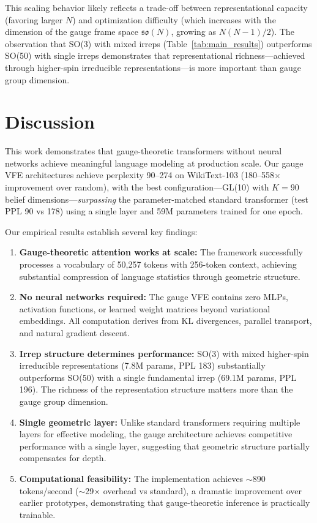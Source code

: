 \documentclass[twoside,11pt]{article}
\begin{document}
This scaling behavior likely reflects a trade-off between representational capacity (favoring larger $N$) and optimization difficulty (which increases with the dimension of the gauge frame space $\mathfrak{so}(N)$, growing as $N(N-1)/2$). The observation that SO(3) with mixed irreps (Table~\ref{tab:main_results}) outperforms SO(50) with single irreps demonstrates that representational richness---achieved through higher-spin irreducible representations---is more important than gauge group dimension.

\section{Discussion}
\label{sec:discussion}

This work demonstrates that gauge-theoretic transformers without neural networks achieve meaningful language modeling at production scale. Our gauge VFE architectures achieve perplexity 90--274 on WikiText-103 (180--558$\times$ improvement over random), with the best configuration---GL(10) with $K{=}90$ belief dimensions---\emph{surpassing} the parameter-matched standard transformer (test PPL 90 vs 178) using a single layer and 59M parameters trained for one epoch.

Our empirical results establish several key findings:

\begin{enumerate}
  \item \textbf{Gauge-theoretic attention works at scale:} The framework successfully processes a vocabulary of 50,257 tokens with 256-token context, achieving substantial compression of language statistics through geometric structure.

  \item \textbf{No neural networks required:} The gauge VFE contains zero MLPs, activation functions, or learned weight matrices beyond variational embeddings. All computation derives from KL divergences, parallel transport, and natural gradient descent.

  \item \textbf{Irrep structure determines performance:} SO(3) with mixed higher-spin irreducible representations (7.8M params, PPL 183) substantially outperforms SO(50) with a single fundamental irrep (69.1M params, PPL 196). The richness of the representation structure matters more than the gauge group dimension.

  \item \textbf{Single geometric layer:} Unlike standard transformers requiring multiple layers for effective modeling, the gauge architecture achieves competitive performance with a single layer, suggesting that geometric structure partially compensates for depth.

  \item \textbf{Computational feasibility:} The implementation achieves $\sim$890 tokens/second ($\sim$29$\times$ overhead vs standard), a dramatic improvement over earlier prototypes, demonstrating that gauge-theoretic inference is practically trainable.
\end{enumerate}
\end{document}
